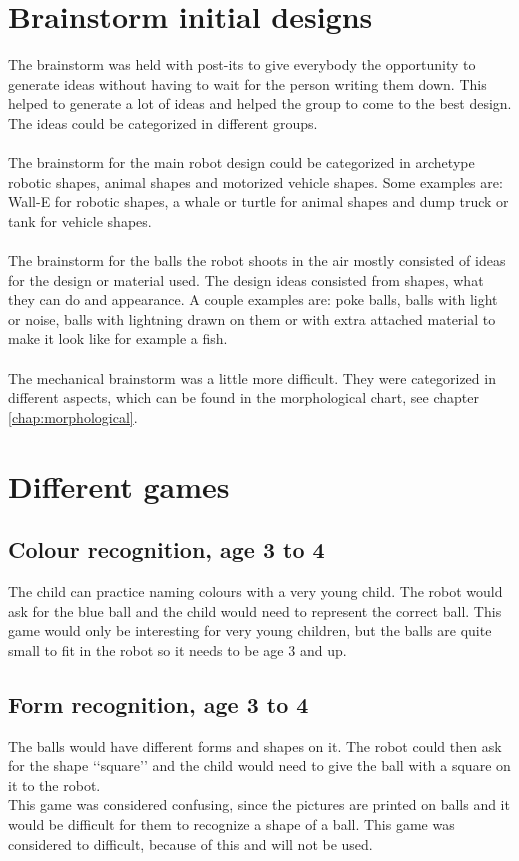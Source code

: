 \documentclass[11pt,twoside,a4paper]{report}
\begin{document}
\begin{appendices}
\chapter{Brainstorm initial designs}
The brainstorm was held with post-its to give everybody the opportunity to generate ideas without having to wait for the person writing them down. This helped to generate a lot of ideas and helped the group to come to the best design. The ideas could be categorized in different groups.\\
 \\
The brainstorm for the main robot design could be categorized in archetype robotic shapes, animal shapes and motorized vehicle shapes. Some examples are: Wall-E for robotic shapes, a whale or turtle for animal shapes and dump truck or tank for vehicle shapes.\\
 \\
The brainstorm for the balls the robot shoots in the air mostly consisted of ideas for the design or material used. The design ideas consisted from shapes, what they can do and appearance. A couple examples are: poke balls, balls with light or noise, balls with lightning drawn on them or with extra attached material to make it look like for example a fish.\\
 \\
The mechanical brainstorm was a little more difficult. They were categorized in different aspects, which can be found in the morphological chart, see chapter \ref{chap:morphological}.
\label{appendix:brainstorm}
\chapter{Different games}
\section*{Colour recognition, age 3 to 4}
The child can practice naming colours with a very young child. The robot would ask for the blue ball and the child would need to represent the correct ball. This game would only be interesting for very young children, but the balls are quite small to fit in the robot so it needs to be age 3 and up.
\section*{Form recognition, age 3 to 4}
The balls would have different forms and shapes on it. The robot could then ask for the shape \lq\lq{}square\rq\rq{} and the child would need to give the ball with a square on it to the robot.\\
This game was considered confusing, since the pictures are printed on balls and it would be difficult for them to recognize a shape of a ball. This game was considered to difficult, because of this and will not be used.

\end{appendices}
\end{document}
